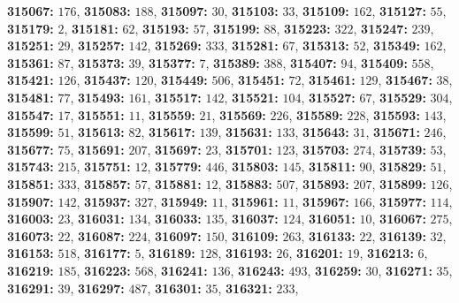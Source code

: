 \textsf{\bfseries 315067:} $176$, \textsf{\bfseries 315083:} $188$, \textsf{\bfseries 315097:} $30$, \textsf{\bfseries 315103:} $33$, \textsf{\bfseries 315109:} $162$, \textsf{\bfseries 315127:} $55$, \textsf{\bfseries 315179:} $2$, \textsf{\bfseries 315181:} $62$, \textsf{\bfseries 315193:} $57$, \textsf{\bfseries 315199:} $88$, \textsf{\bfseries 315223:} $322$, \textsf{\bfseries 315247:} $239$, \textsf{\bfseries 315251:} $29$, \textsf{\bfseries 315257:} $142$, \textsf{\bfseries 315269:} $333$, \textsf{\bfseries 315281:} $67$, \textsf{\bfseries 315313:} $52$, \textsf{\bfseries 315349:} $162$, \textsf{\bfseries 315361:} $87$, \textsf{\bfseries 315373:} $39$, \textsf{\bfseries 315377:} $7$, \textsf{\bfseries 315389:} $388$, \textsf{\bfseries 315407:} $94$, \textsf{\bfseries 315409:} $558$, \textsf{\bfseries 315421:} $126$, \textsf{\bfseries 315437:} $120$, \textsf{\bfseries 315449:} $506$, \textsf{\bfseries 315451:} $72$, \textsf{\bfseries 315461:} $129$, \textsf{\bfseries 315467:} $38$, \textsf{\bfseries 315481:} $77$, \textsf{\bfseries 315493:} $161$, \textsf{\bfseries 315517:} $142$, \textsf{\bfseries 315521:} $104$, \textsf{\bfseries 315527:} $67$, \textsf{\bfseries 315529:} $304$, \textsf{\bfseries 315547:} $17$, \textsf{\bfseries 315551:} $11$, \textsf{\bfseries 315559:} $21$, \textsf{\bfseries 315569:} $226$, \textsf{\bfseries 315589:} $228$, \textsf{\bfseries 315593:} $143$, \textsf{\bfseries 315599:} $51$, \textsf{\bfseries 315613:} $82$, \textsf{\bfseries 315617:} $139$, \textsf{\bfseries 315631:} $133$, \textsf{\bfseries 315643:} $31$, \textsf{\bfseries 315671:} $246$, \textsf{\bfseries 315677:} $75$, \textsf{\bfseries 315691:} $207$, \textsf{\bfseries 315697:} $23$, \textsf{\bfseries 315701:} $123$, \textsf{\bfseries 315703:} $274$, \textsf{\bfseries 315739:} $53$, \textsf{\bfseries 315743:} $215$, \textsf{\bfseries 315751:} $12$, \textsf{\bfseries 315779:} $446$, \textsf{\bfseries 315803:} $145$, \textsf{\bfseries 315811:} $90$, \textsf{\bfseries 315829:} $51$, \textsf{\bfseries 315851:} $333$, \textsf{\bfseries 315857:} $57$, \textsf{\bfseries 315881:} $12$, \textsf{\bfseries 315883:} $507$, \textsf{\bfseries 315893:} $207$, \textsf{\bfseries 315899:} $126$, \textsf{\bfseries 315907:} $142$, \textsf{\bfseries 315937:} $327$, \textsf{\bfseries 315949:} $11$, \textsf{\bfseries 315961:} $11$, \textsf{\bfseries 315967:} $166$, \textsf{\bfseries 315977:} $114$, \textsf{\bfseries 316003:} $23$, \textsf{\bfseries 316031:} $134$, \textsf{\bfseries 316033:} $135$, \textsf{\bfseries 316037:} $124$, \textsf{\bfseries 316051:} $10$, \textsf{\bfseries 316067:} $275$, \textsf{\bfseries 316073:} $22$, \textsf{\bfseries 316087:} $224$, \textsf{\bfseries 316097:} $150$, \textsf{\bfseries 316109:} $263$, \textsf{\bfseries 316133:} $22$, \textsf{\bfseries 316139:} $32$, \textsf{\bfseries 316153:} $518$, \textsf{\bfseries 316177:} $5$, \textsf{\bfseries 316189:} $128$, \textsf{\bfseries 316193:} $26$, \textsf{\bfseries 316201:} $19$, \textsf{\bfseries 316213:} $6$, \textsf{\bfseries 316219:} $185$, \textsf{\bfseries 316223:} $568$, \textsf{\bfseries 316241:} $136$, \textsf{\bfseries 316243:} $493$, \textsf{\bfseries 316259:} $30$, \textsf{\bfseries 316271:} $35$, \textsf{\bfseries 316291:} $39$, \textsf{\bfseries 316297:} $487$, \textsf{\bfseries 316301:} $35$, \textsf{\bfseries 316321:} $233$, 
